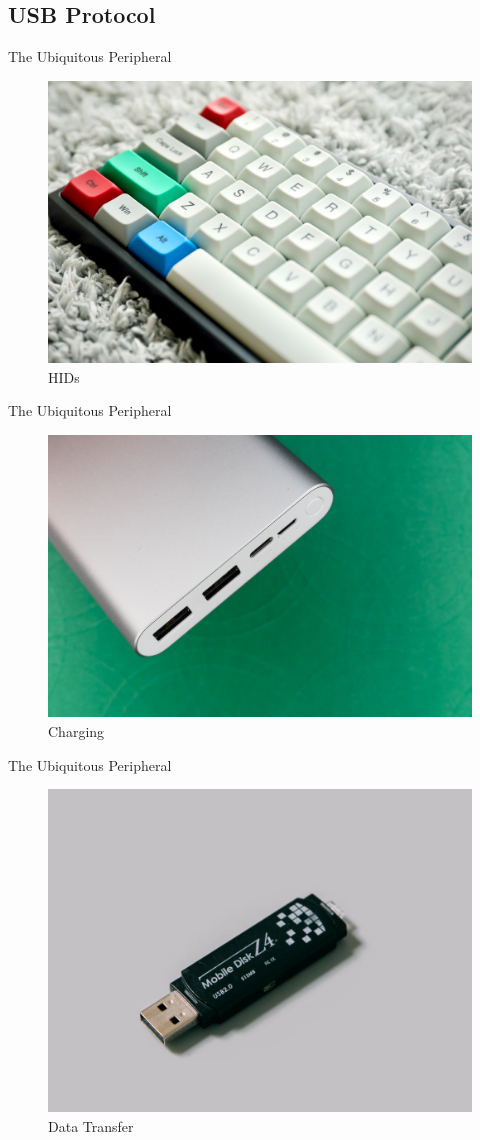 \documentclass{beamer}
\begin{document}
\subsection{USB Protocol}
\begin{frame}{The Ubiquitous Peripheral}
	\begin{figure}[htbp]
		\includegraphics[width=.7\textwidth]{Figs/keyboard.jpg}
		\caption*{HIDs}
	\end{figure}
\end{frame}
\begin{frame}{The Ubiquitous Peripheral}
	\begin{figure}[htbp]
		\includegraphics[width=.7\textwidth]{Figs/powerbank.jpg}
		\caption*{Charging}
	\end{figure}
\end{frame}
\begin{frame}{The Ubiquitous Peripheral}
	\begin{figure}[htbp]
		\includegraphics[width=.7\textwidth]{Figs/flashdrive.jpg}
		\caption*{Data Transfer}
	\end{figure}
\end{frame}
\end{document}
